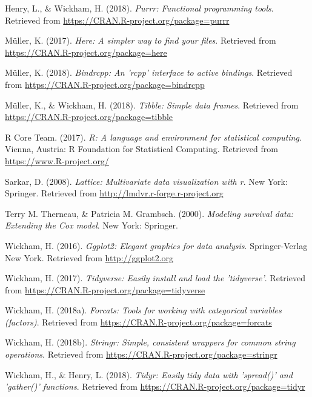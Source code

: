 \documentclass[man]{apa6}
\begin{document}
\hypertarget{ref-R-purrr}{}
Henry, L., \& Wickham, H. (2018). \emph{Purrr: Functional programming
tools}. Retrieved from \url{https://CRAN.R-project.org/package=purrr}

\hypertarget{ref-R-here}{}
Müller, K. (2017). \emph{Here: A simpler way to find your files}.
Retrieved from \url{https://CRAN.R-project.org/package=here}

\hypertarget{ref-R-bindrcpp}{}
Müller, K. (2018). \emph{Bindrcpp: An 'rcpp' interface to active
bindings}. Retrieved from
\url{https://CRAN.R-project.org/package=bindrcpp}

\hypertarget{ref-R-tibble}{}
Müller, K., \& Wickham, H. (2018). \emph{Tibble: Simple data frames}.
Retrieved from \url{https://CRAN.R-project.org/package=tibble}

\hypertarget{ref-R-base}{}
R Core Team. (2017). \emph{R: A language and environment for statistical
computing}. Vienna, Austria: R Foundation for Statistical Computing.
Retrieved from \url{https://www.R-project.org/}

\hypertarget{ref-R-lattice}{}
Sarkar, D. (2008). \emph{Lattice: Multivariate data visualization with
r}. New York: Springer. Retrieved from
\url{http://lmdvr.r-forge.r-project.org}

\hypertarget{ref-R-survival-book}{}
Terry M. Therneau, \& Patricia M. Grambsch. (2000). \emph{Modeling
survival data: Extending the Cox model}. New York: Springer.

\hypertarget{ref-R-ggplot2}{}
Wickham, H. (2016). \emph{Ggplot2: Elegant graphics for data analysis}.
Springer-Verlag New York. Retrieved from \url{http://ggplot2.org}

\hypertarget{ref-R-tidyverse}{}
Wickham, H. (2017). \emph{Tidyverse: Easily install and load the
'tidyverse'}. Retrieved from
\url{https://CRAN.R-project.org/package=tidyverse}

\hypertarget{ref-R-forcats}{}
Wickham, H. (2018a). \emph{Forcats: Tools for working with categorical
variables (factors)}. Retrieved from
\url{https://CRAN.R-project.org/package=forcats}

\hypertarget{ref-R-stringr}{}
Wickham, H. (2018b). \emph{Stringr: Simple, consistent wrappers for
common string operations}. Retrieved from
\url{https://CRAN.R-project.org/package=stringr}

\hypertarget{ref-R-tidyr}{}
Wickham, H., \& Henry, L. (2018). \emph{Tidyr: Easily tidy data with
'spread()' and 'gather()' functions}. Retrieved from
\url{https://CRAN.R-project.org/package=tidyr}
\end{document}
